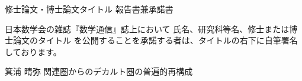 \documentclass[a4paper]{jarticle}
\begin{document}


\begin{center}
{\Large 修士論文・博士論文タイトル 報告書兼承諾書


}
\end{center}

日本数学会の雑誌『数学通信』誌上において
氏名、研究科等名、修士または博士論文のタイトル
を公開することを承諾する者は、タイトルの右下に自筆署名しております。


\bigskip
\begin{master}
\item[箕浦 晴弥]{関連圏からのデカルト圏の普遍的再構成}{\sign}
\end{master}
\end{document}
